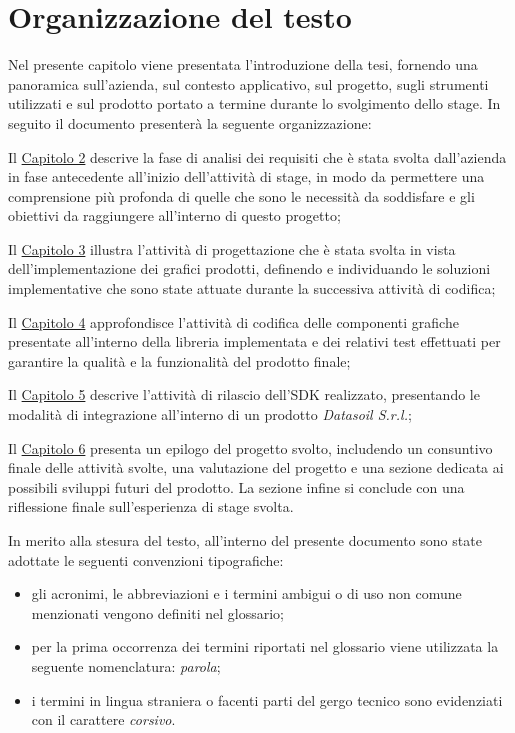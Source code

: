 \section{Organizzazione del testo}
Nel presente capitolo viene presentata l'introduzione della tesi, fornendo una panoramica sull'azienda, sul contesto applicativo,
sul progetto, sugli strumenti utilizzati e sul prodotto portato a termine durante lo svolgimento dello stage. \newline
In seguito il documento presenterà la seguente organizzazione:

\begin{description}
      \item Il {\hyperref[chap:analisi-requisiti]{Capitolo 2}} descrive la fase di analisi dei requisiti che è stata
            svolta dall'azienda in fase antecedente all'inizio dell'attività di stage, in modo da permettere una comprensione più profonda
            di quelle che sono le necessità da soddisfare e gli obiettivi da raggiungere all'interno di questo progetto;

      \item Il {\hyperref[chap:progettazione]{Capitolo 3}} illustra l'attività di progettazione che è stata svolta in vista dell'implementazione
            dei grafici prodotti, definendo e individuando le soluzioni implementative che sono state attuate durante la successiva attività di codifica;

      \item Il {\hyperref[chap:realizzazione-testing]{Capitolo 4}} approfondisce l'attività di codifica delle componenti grafiche presentate
            all'interno della libreria implementata e dei relativi test effettuati per garantire la qualità e la funzionalità del prodotto finale;

      \item Il {\hyperref[chap:rilascio]{Capitolo 5}} descrive l'attività di rilascio dell'SDK realizzato, presentando le modalità di integrazione
            all'interno di un prodotto \textit{Datasoil S.r.l.};

      \item Il {\hyperref[chap:conclusioni]{Capitolo 6}} presenta un epilogo del progetto svolto, includendo un consuntivo finale delle attività svolte,
            una valutazione del progetto e una sezione dedicata ai possibili sviluppi futuri del prodotto.
            La sezione infine si conclude con una riflessione finale sull'esperienza di stage svolta.
\end{description}
In merito alla stesura del testo, all'interno del presente documento sono state adottate le seguenti convenzioni tipografiche:
\begin{itemize}
      \item gli acronimi, le abbreviazioni e i termini ambigui o di uso non comune menzionati vengono definiti nel glossario;
      \item per la prima occorrenza dei termini riportati nel glossario viene utilizzata la seguente nomenclatura: \textit{parola}\glox\gloxspacing;
      \item i termini in lingua straniera o facenti parti del gergo tecnico sono evidenziati con il carattere \textit{corsivo}.
\end{itemize}

